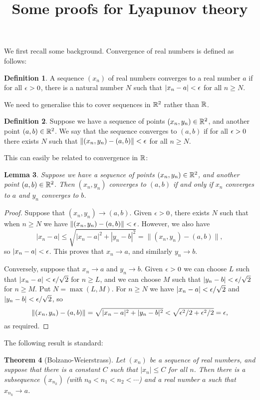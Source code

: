 \documentclass[reqno]{amsart}
\newtheorem{theorem}{Theorem}
\newtheorem{lemma}[theorem]{Lemma}
\theoremstyle{definition}
\newtheorem{definition}[theorem]{Definition}
\begin{document}
\title{Some proofs for Lyapunov theory}
\maketitle

We first recall some background.  Convergence of real numbers is
defined as follows:

\begin{definition}
 A sequence $(x_n)$ of real numbers converges to a real number $a$ if
 for all $\epsilon>0$, there is a natural number $N$ such that
 $|x_n-a|<\epsilon$ for all $n\geq N$.
\end{definition}

We need to generalise this to cover sequences in ${\mathbb{R}}^2$ rather than
${\mathbb{R}}$. 

\begin{definition}
 Suppose we have a sequence of points $(x_n,y_n)\in{\mathbb{R}}^2$, and another
 point $(a,b)\in{\mathbb{R}}^2$.  We say that the sequence converges to $(a,b)$
 if for all $\epsilon>0$ there exists $N$ such that
 $\|(x_n,y_n)-(a,b)\|<\epsilon$ for all $n\geq N$.
\end{definition}

This can easily be related to convergence in ${\mathbb{R}}$:
\begin{lemma}
 Suppose we have a sequence of points $(x_n,y_n)\in{\mathbb{R}}^2$, and another
 point $(a,b)\in{\mathbb{R}}^2$.  Then $(x_n,y_n)$ converges to $(a,b)$ if and
 only if $x_n$ converges to $a$ and $y_n$ converges to $b$.
\end{lemma}
\begin{proof}
 Suppose that $(x_n,y_n)\to (a,b)$.  Given $\epsilon>0$, there
 exists $N$ such that when $n\geq N$ we have
 $\|(x_n,y_n)-(a,b)\|<\epsilon$.  However, we also have 
 \[ |x_n-a| \leq \sqrt{|x_n-a|^2+|y_n-b|^2} = \|(x_n,y_n)-(a,b)\|, \]
 so $|x_n-a|<\epsilon$.  This proves that $x_n\to a$, and similarly
 $y_n\to b$.

 Conversely, suppose that $x_n\to a$ and $y_n\to b$.  Given $\epsilon>0$ we
 can choose $L$ such that $|x_n-a|<\epsilon/\sqrt{2}$ for $n\geq L$, and we
 can choose $M$ such that $|y_n-b|<\epsilon/\sqrt{2}$ for $n\geq M$.  Put
 $N=\max(L,M)$.  For $n\geq N$ we have $|x_n-a|<\epsilon/\sqrt{2}$ and
 $|y_n-b|<\epsilon/\sqrt{2}$, so 
 \[ \|(x_n,y_n)-(a,b)\| = \sqrt{|x_n-a|^2+|y_n-b|^2} <
      \sqrt{\epsilon^2/2+\epsilon^2/2} = \epsilon,
 \]
 as required.
\end{proof}

The following result is standard:
\begin{theorem}[Bolzano-Weierstrass]
 Let $(x_n)$ be a sequence of real numbers, and suppose that there is
 a constant $C$ such that $|x_n|\leq C$ for all $n$.  Then there is a
 subsequence $(x_{n_k})$ (with $n_0<n_1<n_2<\dotsb $) and a real
 number $a$ such that $x_{n_k}\to a$.
\end{theorem}
\end{document}
